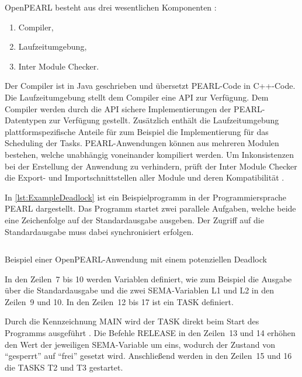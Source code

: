 OpenPEARL besteht aus drei wesentlichen Komponenten
\autocite{OpenPEARL_Structure}:
\begin{enumerate}
  \item Compiler,
  \item Laufzeitumgebung,
  \item Inter Module Checker.
\end{enumerate}
Der Compiler ist in Java geschrieben und übersetzt PEARL-Code in C++-Code. Die
Laufzeitumgebung stellt dem Compiler eine API zur Verfügung. Dem Compiler werden
durch die API sichere Implementierungen der PEARL-Datentypen zur Verfügung
gestellt. Zusätzlich enthält die Laufzeitumgebung plattformspezifische Anteile
für zum Beispiel die Implementierung für das Scheduling der Tasks.
PEARL-Anwendungen können aus mehreren Modulen bestehen, welche unabhängig
voneinander kompiliert werden. Um Inkonsistenzen bei der Erstellung der
Anwendung zu verhindern, prüft der Inter Module Checker die Export- und
Importschnittstellen aller Module und deren Kompatibilität
\autocite{OpenPEARL_Structure}.

In \cref{lst:ExampleDeadlock} ist ein Beispielprogramm in der Programmiersprache
PEARL dargestellt. Das Programm startet zwei parallele Aufgaben, welche beide
eine Zeichenfolge auf der Standardausgabe ausgeben. Der Zugriff auf die
Standardausgabe muss dabei synchronisiert erfolgen.
\begin{listing}[ht]
  \inputminted[frame=lines,linenos]{vim}{./Examples/Example_Deadlock.prl}
  \caption{Beispiel einer OpenPEARL-Anwendung mit einem potenziellen Deadlock}
  \label{lst:ExampleDeadlock}   
\end{listing} 
In den Zeilen~7 bis 10 werden Variablen definiert, wie zum Beispiel die Ausgabe
über die Standardausgabe und die zwei \textrm{SEMA}-Variablen \textrm{L1} und
\textrm{L2} in den Zeilen~9 und 10. In den Zeilen~12 bis 17 ist ein \textrm{TASK}
definiert.

Durch die Kennzeichnung \textrm{MAIN} wird der \textrm{TASK} direkt beim Start
des Programms ausgeführt \autocite[vgl.][28]{PEARL}. Die Befehle
\textrm{RELEASE} in den Zeilen~13 und 14 erhöhen den Wert der jeweiligen
\textrm{SEMA}-Variable um eins, wodurch der Zustand von "`gesperrt"' auf
"`frei"' gesetzt wird. Anschließend werden in den Zeilen~15 und 16 die
\textrm{TASKS} \textrm{T2} und \textrm{T3} gestartet.

